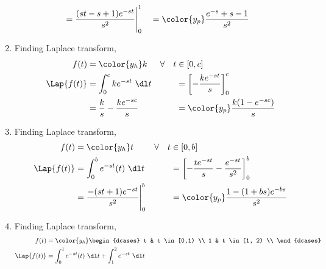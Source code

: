 \begin{enumerate}
\begin{align}
                                   & = \frac{(st - s + 1)e^{-st}}{s^2} \Bigg|_0^1 &
                                   & = \color{y_p}\frac{e^{-s} + s - 1}{s^2}
            \end{align}
      \item Finding Laplace transform,
            \begin{align}
                  f(t)             & = \color{y_h} k                          &
                  \forall \quad  t & \in [0,c]                                  \\
                  \Lap\{f(t)\}     & =  \int_{0}^{c} ke^{-st}\ \dl t          &
                                   & = \left[ -\frac{ke^{-st}}{s} \right]_0^c   \\
                                   & = \frac{k}{s} - \frac{ke^{-sc}}{s}       &
                                   & = \color{y_p}\frac{k(1 - e^{-sc})}{s}
            \end{align}
      \item Finding Laplace transform,
            \begin{align}
                  f(t)             & = \color{y_h} t                            &
                  \forall \quad  t & \in [0,b]                                    \\
                  \Lap\{f(t)\}     & =  \int_{0}^{b} e^{-st}(t)\ \dl t          &
                                   & = \left[ -\frac{te^{-st}}{s} -
                  \frac{e^{-st}}{s^2} \right]_0^b                                 \\
                                   & = \frac{-(st+1)e^{-st}}{s^2}\Bigg|_0^b     &
                                   & = \color{y_p}\frac{1 - (1+bs)e^{-bs}}{s^2}
            \end{align}
      \item Finding Laplace transform,
            \begin{align}
                  f(t)         & = \color{y_h}
                  \begin{dcases}
                        t & t \in [0,1)  \\
                        1 & t \in [1, 2) \\
                  \end{dcases}                                             \\
                  \Lap\{f(t)\} & =  \int_{0}^{1} e^{-st}(t)\ \dl t
                  +  \int_{1}^{2} e^{-st}\ \dl t                               \\

\end{align}
\end{enumerate}
